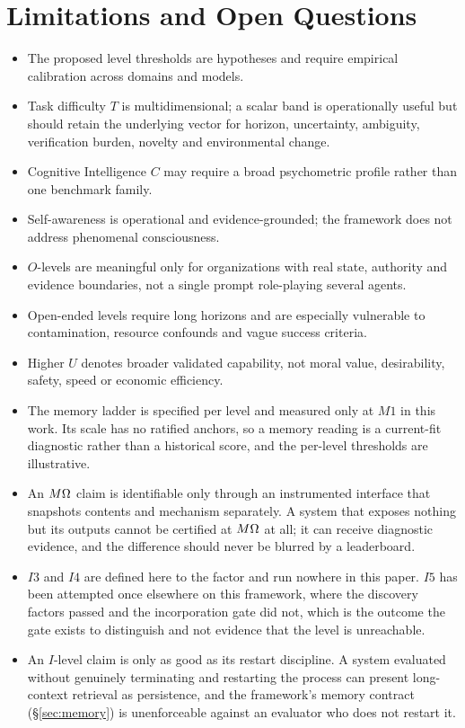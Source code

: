 \section{Limitations and Open Questions}\label{sec:limitations}

\begin{itemize}
\item The proposed level thresholds are hypotheses and require empirical calibration across domains and models.
\item Task difficulty $T$ is multidimensional; a scalar band is operationally useful but should retain the underlying vector for horizon, uncertainty, ambiguity, verification burden, novelty and environmental change.
\item Cognitive Intelligence $C$ may require a broad psychometric profile rather than one benchmark family.
\item Self-awareness is operational and evidence-grounded; the framework does not address phenomenal consciousness.
\item $O$-levels are meaningful only for organizations with real state, authority and evidence boundaries, not a single prompt role-playing several agents.
\item Open-ended levels require long horizons and are especially vulnerable to contamination, resource confounds and vague success criteria.
\item Higher $U$ denotes broader validated capability, not moral value, desirability, safety, speed or economic efficiency.
\item The memory ladder is specified per level and measured only at $M1$ in this work. Its scale has no ratified anchors, so a memory reading is a current-fit diagnostic rather than a historical score, and the per-level thresholds are illustrative.
\item An $M\Omega{}$ claim is identifiable only through an instrumented interface that snapshots contents and mechanism separately. A system that exposes nothing but its outputs cannot be certified at $M\Omega{}$ at all; it can receive diagnostic evidence, and the difference should never be blurred by a leaderboard.
\item $I3$ and $I4$ are defined here to the factor and run nowhere in this paper. $I5$ has been attempted once elsewhere on this framework, where the discovery factors passed and the incorporation gate did not, which is the outcome the gate exists to distinguish and not evidence that the level is unreachable.
\item An $I$-level claim is only as good as its restart discipline. A system evaluated without genuinely terminating and restarting the process can present long-context retrieval as persistence, and the framework's memory contract (\S\ref{sec:memory}) is unenforceable against an evaluator who does not restart it.
\end{itemize}

